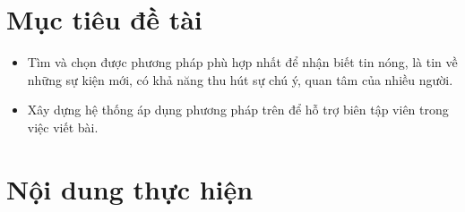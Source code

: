 \section{Mục tiêu đề tài}
	\begin{itemize}
		\item Tìm và chọn được phương pháp phù hợp nhất để nhận biết tin nóng, là tin về những sự kiện mới, có khả năng thu hút sự chú ý, quan tâm của nhiều người.
		\item Xây dựng hệ thống áp dụng phương pháp trên để hỗ trợ biên tập viên trong việc viết bài.
	\end{itemize}

\section{Nội dung thực hiện}
%	

